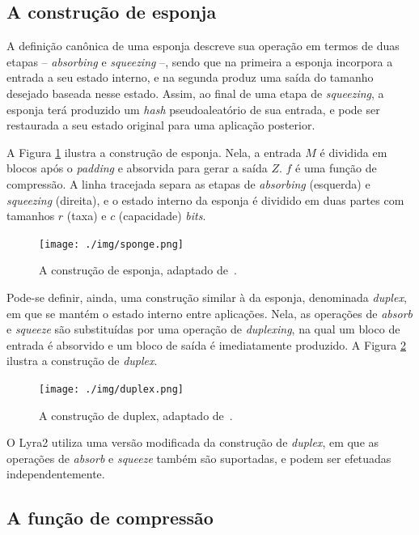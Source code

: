 \documentclass{article}
\begin{document}
\subsection{A construção de esponja}

A definição canônica de uma esponja \cite{sponge} descreve sua operação
em termos de duas etapas -- \emph{absorbing} e \emph{squeezing} --,
sendo que na primeira a esponja incorpora a entrada a seu estado
interno, e na segunda produz uma saída do tamanho desejado baseada nesse
estado. Assim, ao final de uma etapa de \emph{squeezing}, a esponja terá
produzido um \emph{hash} pseudoaleatório de sua entrada, e pode ser
restaurada a seu estado original para uma aplicação posterior.

A Figura \ref{img-sponge} ilustra a construção de esponja. Nela, a
entrada $M$ é dividida em blocos após o \emph{padding} e absorvida
para gerar a saída $Z$. $f$ é uma função de compressão. A linha
tracejada separa as etapas de \emph{absorbing} (esquerda) e
\emph{squeezing} (direita), e o estado interno da esponja é dividido em
duas partes com tamanhos $r$ (taxa) e $c$ (capacidade)
\emph{bits}.

\begin{figure}[htbp]
\centering
\texttt{[image: ./img/sponge.png]}
\caption{A construção de esponja, adaptado de~\cite{sponge}.\label{img-sponge}}
\end{figure}

Pode-se definir, ainda, uma construção similar à da esponja, denominada
\emph{duplex}, em que se mantém o estado interno entre aplicações. Nela,
as operações de \emph{absorb} e \emph{squeeze} são substituídas por uma
operação de \emph{duplexing}, na qual um bloco de entrada é absorvido e
um bloco de saída é imediatamente produzido. A Figura \ref{img-duplex}
ilustra a construção de \emph{duplex}.

\begin{figure}[htbp]
\centering
\texttt{[image: ./img/duplex.png]}
\caption{A construção de duplex, adaptado de~\cite{sponge}.\label{img-duplex}}
\end{figure}

O Lyra2 utiliza uma versão modificada da construção de \emph{duplex}, em
que as operações de \emph{absorb} e \emph{squeeze} também são
suportadas, e podem ser efetuadas independentemente.

\subsection{A função de compressão}\label{sec-compression-fn}
\end{document}
